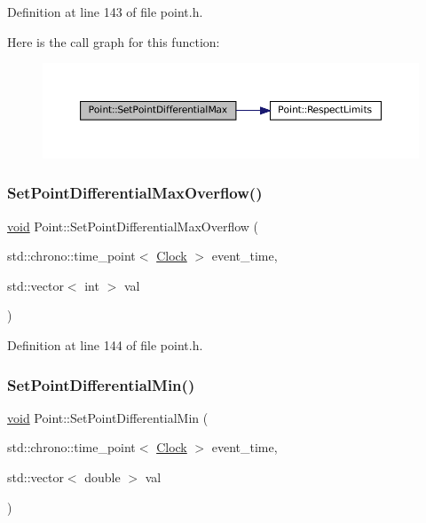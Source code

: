 Definition at line 143 of file point.\+h.

Here is the call graph for this function\+:\nopagebreak
\begin{figure}[H]
\begin{center}
\leavevmode
\includegraphics[width=350pt]{class_point_ac2e53da4cbee0dc39c0b7a4d3e3a6ee5_cgraph}
\end{center}
\end{figure}
\mbox{\label{class_point_a0b1ce0db9514762fc3aa9d57fa3034a0}} 
\subsubsection{\texorpdfstring{Set\+Point\+Differential\+Max\+Overflow()}{SetPointDifferentialMaxOverflow()}}
{\footnotesize\ttfamily \mbox{\hyperlink{glad_8h_a950fc91edb4504f62f1c577bf4727c29}{void}} Point\+::\+Set\+Point\+Differential\+Max\+Overflow (\begin{DoxyParamCaption}\item[{std\+::chrono\+::time\+\_\+point$<$ \mbox{\hyperlink{universe_8h_a0ef8d951d1ca5ab3cfaf7ab4c7a6fd80}{Clock}} $>$}]{event\+\_\+time,  }\item[{std\+::vector$<$ int $>$}]{val }\end{DoxyParamCaption})\hspace{0.3cm}{\ttfamily [inline]}}



Definition at line 144 of file point.\+h.

\mbox{\label{class_point_a944fcec52017ce88e052a576ef143926}} 
\subsubsection{\texorpdfstring{Set\+Point\+Differential\+Min()}{SetPointDifferentialMin()}}
{\footnotesize\ttfamily \mbox{\hyperlink{glad_8h_a950fc91edb4504f62f1c577bf4727c29}{void}} Point\+::\+Set\+Point\+Differential\+Min (\begin{DoxyParamCaption}\item[{std\+::chrono\+::time\+\_\+point$<$ \mbox{\hyperlink{universe_8h_a0ef8d951d1ca5ab3cfaf7ab4c7a6fd80}{Clock}} $>$}]{event\+\_\+time,  }\item[{std\+::vector$<$ double $>$}]{val }\end{DoxyParamCaption})\hspace{0.3cm}{\ttfamily [inline]}}



